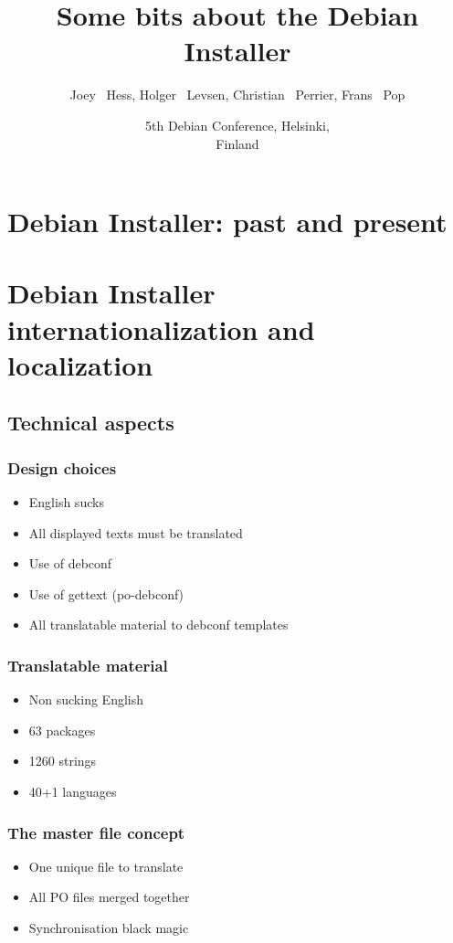 \documentclass{beamer}
\title[Some bits about the Debian Installer] %
{Some bits about the Debian Installer}
\author[joeyh, h0lger, bubulle, fjp] %
{Joey ~Hess, Holger ~Levsen, Christian ~Perrier, Frans ~Pop}
\date[Debconf 5] %
{5th Debian Conference, Helsinki,\\ Finland}
\begin{document}
\begin{frame}
  \titlepage
\end{frame}


\section{Debian Installer: past and present}

\begin{frame}
  \frametitle{}
\end{frame}


\section{Debian Installer internationalization and localization}

\subsection{Technical aspects}

\begin{frame}
  \frametitle{Design choices}
	\begin{itemize}
	\item
		English sucks
	\item
		All displayed texts must be translated
	\item
		Use of debconf
	\item
		Use of gettext (po-debconf)
	\item
		All translatable material to debconf templates
	\end{itemize}
\end{frame}

\begin{frame}
  \frametitle{Translatable material}
	\begin{itemize}
	\item
		Non sucking English
	\item
		63 packages 
	\item
		1260 strings
	\item
		40+1 languages
	\end{itemize}
\end{frame}

\begin{frame}
  \frametitle{The master file concept}
	\begin{itemize}
	\item
		One unique file to translate
	\item
		All PO files merged together
	\item
		Synchronisation black magic
	\end{itemize}
\end{frame}
\end{document}
